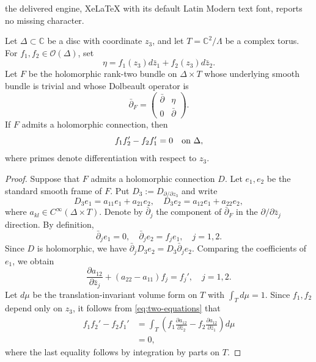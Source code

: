 \documentclass[10pt,a4paper]{amsart}
\newcommand{\C}{\mathbb C}
\newcommand{\OO}{\mathcal O}
\newcommand{\bp}{\bar{\partial}}
\begin{document}
the delivered engine, XeLaTeX with its default Latin Modern text font, reports no missing character.
		\begin{lemma}\label{lem:obstruction}
			Let $\Delta\subset\C$ be a disc with coordinate $z_3$, and let
			$T=\C^2/\Lambda$ be a complex torus. For $f_1,f_2\in\OO(\Delta)$, set
			$$
			\eta=f_1(z_3)d\bar z_1+f_2(z_3)d\bar z_2.
			$$
			Let $F$ be the holomorphic rank-two bundle on $\Delta\times T$ whose underlying
			smooth bundle is trivial and whose Dolbeault operator is
			$$
			\bp_F=\begin{pmatrix}\bp&\eta\\0&\bp\end{pmatrix}.
			$$
			If $F$ admits a holomorphic connection, then
			\begin{equation*}\label{eq:obstruction}
				f_1f_2'-f_2f_1'=0\quad\hbox{on }\Delta,
			\end{equation*}
			where primes denote differentiation with respect to $z_3$.
		\end{lemma}

		\begin{proof}
			Suppose that $F$ admits a holomorphic connection $D$. Let $e_1,e_2$
			be the standard smooth frame of $F$. Put
			$D_3:=D_{\partial/\partial z_3}$ and write
			$$
			D_3e_1=a_{11}e_1+a_{21}e_2,\quad
			D_3e_2=a_{12}e_1+a_{22}e_2,
			$$
			where $a_{kl}\in C^\infty(\Delta\times T)$. Denote by $\bp_j$ the component
			of $\bp_F$ in the $\partial/\partial\bar z_j$ direction. By definition,
			$$
			\bp_je_1=0,\quad \bp_je_2=f_je_1,\quad j=1,2.
			$$
			Since $D$ is holomorphic, we have
			$\bp_jD_3e_2=D_3\bp_je_2$. Comparing the coefficients of
			$e_1$, we obtain
			\begin{equation}\label{eq:two-equations}
				\frac{\partial a_{12}}{\partial\bar z_j}
				+(a_{22}-a_{11})f_j=f_j',\quad j=1,2.
			\end{equation}
			Let $d\mu$ be the translation-invariant volume form on $T$ with
			$\int_Td\mu=1$. Since $f_1,f_2$ depend only on $z_3$, it follows from
			\eqref{eq:two-equations} that
			$$
			\begin{aligned}
				f_1f_2'-f_2f_1'
				&=\int_T\left(f_1\frac{\partial a_{12}}{\partial\bar z_2}
				-f_2\frac{\partial a_{12}}{\partial\bar z_1}\right)d\mu\\
				&=0,
			\end{aligned}
			$$
			where the last equality follows by integration by parts on $T$.
		\end{proof}
\end{document}
